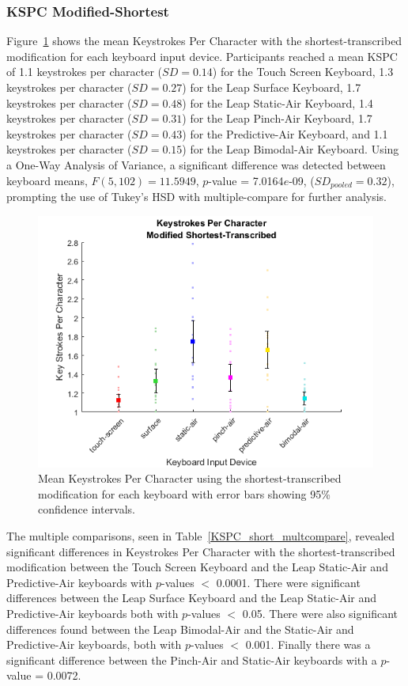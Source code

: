 \subsubsection{KSPC Modified-Shortest}
Figure~\ref{fig_KSPC_short_mean} shows the mean Keystrokes Per Character with the shortest-transcribed modification for each keyboard input device. Participants reached a mean KSPC of 1.1 keystrokes per character ($SD = 0.14$) for the Touch Screen Keyboard, 1.3 keystrokes per character ($SD = 0.27$) for the Leap Surface Keyboard, 1.7 keystrokes per character ($SD = 0.48$) for the Leap Static-Air Keyboard, 1.4 keystrokes per character ($SD = 0.31$) for the Leap Pinch-Air Keyboard, 1.7 keystrokes per character ($SD = 0.43$) for the Predictive-Air Keyboard, and 1.1 keystrokes per character ($SD = 0.15$) for the Leap Bimodal-Air Keyboard. Using a One-Way Analysis of Variance, a significant difference was detected between keyboard means, $F(5, 102) = 11.5949$, $p$-value = 7.0164$e$-09, ($SD_{pooled} = 0.32$), prompting the use of Tukey's HSD with multiple-compare for further analysis.

\begin{figure}[h]
	\centering
	\includegraphics{fig_KSPC_short_mean}
	\caption[Mean Keystrokes Per Character for Modified-Shortest]{Mean Keystrokes Per Character using the shortest-transcribed modification for each keyboard with error bars showing 95\% confidence intervals.}
	\label{fig_KSPC_short_mean}
\end{figure}

The multiple comparisons, seen in Table~\ref{KSPC_short_multcompare}, revealed significant differences in Keystrokes Per Character with the shortest-transcribed modification between the Touch Screen Keyboard and the Leap Static-Air and Predictive-Air keyboards with $p$-values $<$ 0.0001. There were significant differences between the Leap Surface Keyboard and the Leap Static-Air and Predictive-Air keyboards both with $p$-values $<$ 0.05. There were also significant differences found between the Leap Bimodal-Air and the Static-Air and Predictive-Air keyboards, both with $p$-values $<$ 0.001. Finally there was a significant difference between the Pinch-Air and Static-Air keyboards with a $p$-value = 0.0072.

